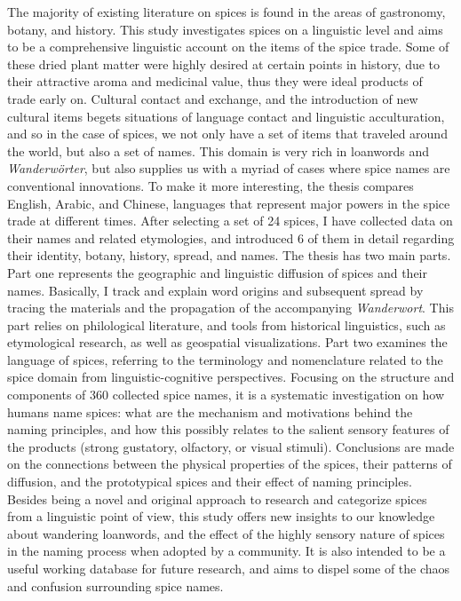 The majority of existing literature on spices is found in the areas of gastronomy, botany, and history. This study investigates spices on a linguistic level and aims to be a comprehensive linguistic account on the items of the spice trade. Some of these dried plant matter were highly desired at certain points in history, due to their attractive aroma and medicinal value, thus they were ideal products of trade early on. Cultural contact and exchange, and the introduction of new cultural items begets situations of language contact and linguistic acculturation, and so in the case of spices, we not only have a set of items that traveled around the world, but also a set of names. This domain is very rich in loanwords and \textit{Wanderwörter}, but also supplies us with a myriad of cases where spice names are conventional innovations. To make it more interesting, the thesis compares English, Arabic, and Chinese, languages that represent major powers in the spice trade at different times. After selecting a set of 24 spices, I have collected data on their names and related etymologies, and introduced 6 of them in detail regarding their identity, botany, history, spread, and names. The thesis has two main parts. Part one represents the geographic and linguistic diffusion of spices and their names. Basically, I track and explain word origins and subsequent spread by tracing the materials and the propagation of the accompanying \textit{Wanderwort}. This part relies on philological literature, and tools from historical linguistics, such as etymological research, as well as geospatial visualizations. Part two examines the language of spices, referring to the terminology and nomenclature related to the spice domain from linguistic-cognitive perspectives. Focusing on the structure and components of 360 collected spice names, it is a systematic investigation on how humans name spices: what are the mechanism and motivations behind the naming principles, and how this possibly relates to the salient sensory features of the products (strong gustatory, olfactory, or visual stimuli). Conclusions are made on the connections between the physical properties of the spices, their patterns of diffusion, and the prototypical spices and their effect of naming principles. Besides being a novel and original approach to research and categorize spices from a linguistic point of view, this study offers new insights to our knowledge about wandering loanwords, and the effect of the highly sensory nature of spices in the naming process when adopted by a community. It is also intended to be a useful working database for future research, and aims to dispel some of the chaos and confusion surrounding spice names.

\relax
{}\relax